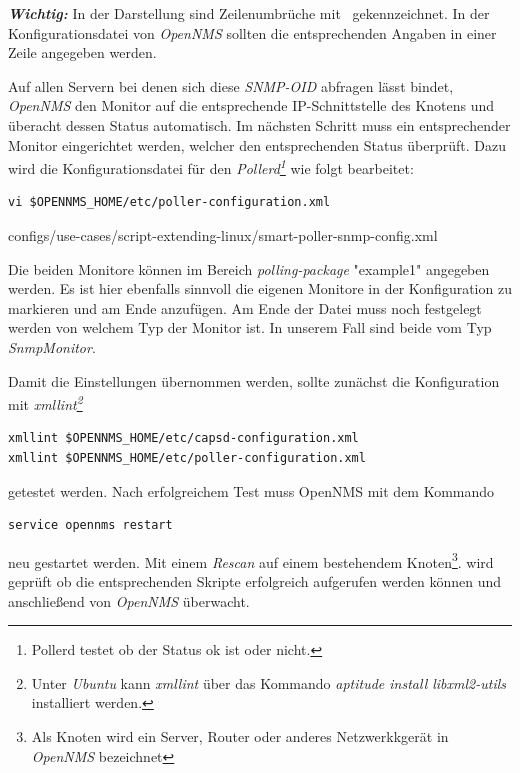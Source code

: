\textbf{\textit{Wichtig:}} In der Darstellung sind Zeilenumbrüche mit \ gekennzeichnet. In der Konfigurationsdatei von \emph{OpenNMS} sollten die entsprechenden Angaben in einer Zeile angegeben werden.

Auf allen Servern bei denen sich diese \emph{SNMP-OID} abfragen lässt bindet, \emph{OpenNMS} den Monitor auf die entsprechende IP-Schnittstelle des Knotens und überacht dessen Status automatisch. Im nächsten Schritt muss ein entsprechender Monitor eingerichtet werden, welcher den entsprechenden Status überprüft. Dazu wird die Konfigurationsdatei für den \emph{Pollerd\footnote{Pollerd testet ob der  Status ok ist oder nicht.}} wie folgt bearbeitet:

\begin{lstlisting}[numbers=none]
vi $OPENNMS_HOME/etc/poller-configuration.xml
\end{lstlisting}


  {configs/use-cases/script-extending-linux/smart-poller-snmp-config.xml}

Die beiden Monitore können im Bereich \emph{polling-package} "example1" angegeben werden. Es ist hier ebenfalls sinnvoll die eigenen Monitore in der Konfiguration zu markieren und am Ende anzufügen. Am Ende der Datei muss noch festgelegt werden von welchem Typ der Monitor ist. In unserem Fall sind beide vom Typ \emph{SnmpMonitor}.

Damit die Einstellungen übernommen werden, sollte zunächst die Konfiguration mit \emph{xmllint\footnote{Unter \emph{Ubuntu} kann \emph{xmllint} über das Kommando \emph{aptitude install libxml2-utils} installiert werden.}}

\begin{lstlisting}[numbers=none]
xmllint $OPENNMS_HOME/etc/capsd-configuration.xml
xmllint $OPENNMS_HOME/etc/poller-configuration.xml
\end{lstlisting}

getestet werden. Nach erfolgreichem Test muss OpenNMS mit dem Kommando

\begin{lstlisting}[numbers=none]
service opennms restart
\end{lstlisting}

neu gestartet werden. Mit einem \emph{Rescan} auf einem bestehendem Knoten\footnote{Als Knoten wird ein Server, Router oder anderes Netzwerkkgerät in \emph{OpenNMS} bezeichnet}. wird geprüft ob die entsprechenden Skripte erfolgreich aufgerufen werden können und anschließend von \emph{OpenNMS} überwacht.


